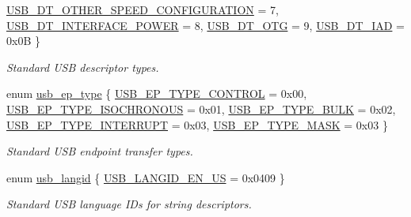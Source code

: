 \begin{DoxyCompactItemize}
\hyperlink{group__usb__protocol__group_gga87d46dd117d939964c939f1518dec93fa629e5f41e4643166d544404799d323ea}{\-U\-S\-B\-\_\-\-D\-T\-\_\-\-O\-T\-H\-E\-R\-\_\-\-S\-P\-E\-E\-D\-\_\-\-C\-O\-N\-F\-I\-G\-U\-R\-A\-T\-I\-O\-N} =  7, 
\hyperlink{group__usb__protocol__group_gga87d46dd117d939964c939f1518dec93faae58238f1f4dd82be5f7797daa88f972}{\-U\-S\-B\-\_\-\-D\-T\-\_\-\-I\-N\-T\-E\-R\-F\-A\-C\-E\-\_\-\-P\-O\-W\-E\-R} =  8, 
\*
\hyperlink{group__usb__protocol__group_gga87d46dd117d939964c939f1518dec93fa7085a50a6df3338204b21aa106e68ab8}{\-U\-S\-B\-\_\-\-D\-T\-\_\-\-O\-T\-G} =  9, 
\hyperlink{group__usb__protocol__group_gga87d46dd117d939964c939f1518dec93fae32d49584455205c80a5675e933810f5}{\-U\-S\-B\-\_\-\-D\-T\-\_\-\-I\-A\-D} =  0x0\-B
 \}
\begin{DoxyCompactList}\small\item\em \-Standard \-U\-S\-B descriptor types. \end{DoxyCompactList}\item 
enum \hyperlink{group__usb__protocol__group_ga666def795a15032e5bf93a450f79113f}{usb\-\_\-ep\-\_\-type} \{ \*
\hyperlink{group__usb__protocol__group_gga666def795a15032e5bf93a450f79113fa134795bdea12ea96534b37c9f606d497}{\-U\-S\-B\-\_\-\-E\-P\-\_\-\-T\-Y\-P\-E\-\_\-\-C\-O\-N\-T\-R\-O\-L} =  0x00, 
\hyperlink{group__usb__protocol__group_gga666def795a15032e5bf93a450f79113fa93bb5aaf88b4842a0bed6a6380790c1e}{\-U\-S\-B\-\_\-\-E\-P\-\_\-\-T\-Y\-P\-E\-\_\-\-I\-S\-O\-C\-H\-R\-O\-N\-O\-U\-S} =  0x01, 
\hyperlink{group__usb__protocol__group_gga666def795a15032e5bf93a450f79113fa173f6c972814d347875b71d85ddfc1b1}{\-U\-S\-B\-\_\-\-E\-P\-\_\-\-T\-Y\-P\-E\-\_\-\-B\-U\-L\-K} =  0x02, 
\hyperlink{group__usb__protocol__group_gga666def795a15032e5bf93a450f79113fa2b6d776cb0d3f3812620bda8fc51439b}{\-U\-S\-B\-\_\-\-E\-P\-\_\-\-T\-Y\-P\-E\-\_\-\-I\-N\-T\-E\-R\-R\-U\-P\-T} =  0x03, 
\*
\hyperlink{group__usb__protocol__group_gga666def795a15032e5bf93a450f79113fa8169dcca1e5ea5ef9e0d11155b9728bb}{\-U\-S\-B\-\_\-\-E\-P\-\_\-\-T\-Y\-P\-E\-\_\-\-M\-A\-S\-K} =  0x03
 \}
\begin{DoxyCompactList}\small\item\em \-Standard \-U\-S\-B endpoint transfer types. \end{DoxyCompactList}\item 
enum \hyperlink{group__usb__protocol__group_ga1f92deaf695c06566999f0c5343978c1}{usb\-\_\-langid} \{ \hyperlink{group__usb__protocol__group_gga1f92deaf695c06566999f0c5343978c1a8acad914e2d28c9bb1d2d3cc74c5b39e}{\-U\-S\-B\-\_\-\-L\-A\-N\-G\-I\-D\-\_\-\-E\-N\-\_\-\-U\-S} =  0x0409
 \}
\begin{DoxyCompactList}\small\item\em \-Standard \-U\-S\-B language \-I\-Ds for string descriptors. \end{DoxyCompactList}\end{DoxyCompactItemize}
